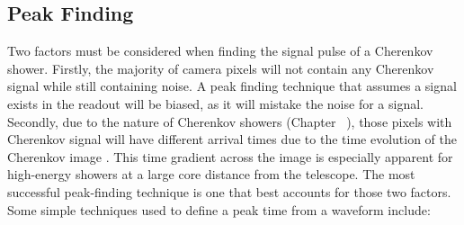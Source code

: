 \subsection{Peak Finding} \label{peakfinding}

Two factors must be considered when finding the signal pulse of a Cherenkov shower. Firstly, the majority of camera pixels will not contain any Cherenkov signal while still containing noise. A peak finding technique that assumes a signal exists in the readout will be biased, as it will mistake the noise for a signal. Secondly, due to the nature of Cherenkov showers (Chapter~ ), those pixels with Cherenkov signal will have different arrival times due to the time evolution of the Cherenkov image . This time gradient across the image is especially apparent for high-energy showers at a large core distance from the telescope. The most successful peak-finding technique is one that best accounts for those two factors. Some simple techniques used to define a peak time from a waveform include:
